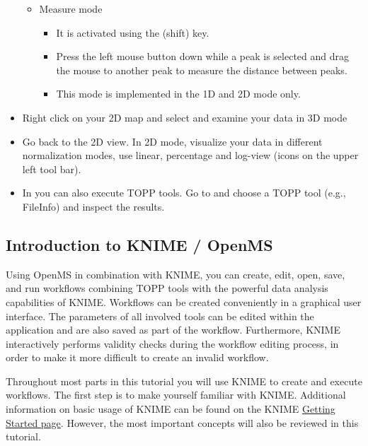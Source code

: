 \begin{itemize}
\begin{itemize}
\begin{itemize}
        \end{itemize}
    \item Measure mode
        \begin{itemize}
        \item It is activated using the \keys{\shift} (shift) key.
        \item Press the left mouse button down while a peak is selected and drag the mouse to
        			another peak to measure the distance between peaks.
        \item This mode is implemented in the 1D and 2D mode only.
        \end{itemize}
    \end{itemize}
\item Right click on your 2D map and select  and examine your
			data in 3D mode
\item Go back to the 2D view. In 2D mode, visualize your data in different normalization modes, use linear, percentage and log-view (icons on the upper left tool bar).
\item In  you can also execute TOPP tools. Go to
			 and choose a TOPP tool (e.g., FileInfo) and
			inspect the results.
\end{itemize}


\subsection{Introduction to KNIME / OpenMS}
\label{KNIME_Intro}

Using OpenMS in combination with KNIME, you can create, edit, open, save, and run workflows
combining TOPP tools with the powerful data analysis capabilities of KNIME. Workflows can
be created conveniently in a graphical user interface. The parameters of all involved
tools can be edited within the application and are also saved as part of the workflow.
Furthermore, KNIME interactively performs validity checks during the workflow editing
process, in order to make it more difficult to create an invalid workflow.

Throughout most parts in this tutorial you will use KNIME to create and
execute workflows. The first step is to make yourself familiar with KNIME. Additional
information on basic usage of KNIME can be found on the KNIME
\href{https://tech.knime.org/knime}{Getting Started page}. However,
the most important concepts will also be reviewed in this tutorial.

